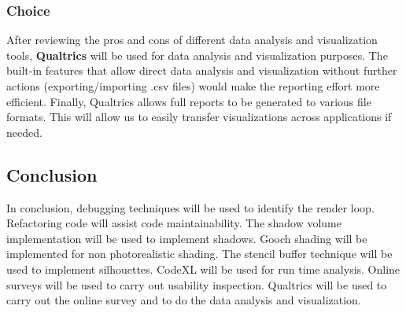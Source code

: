 \documentclass[10pt,journal,compsoc,draftclsnofoot]{IEEEtran}
\begin{document}
\subsubsection{Choice}
After reviewing the pros and cons of different data analysis and visualization tools, \textbf{Qualtrics} will be used for data analysis and visualization purposes.
The built-in features that allow direct data analysis and visualization without further actions (exporting/importing .csv files) would make the reporting effort more efficient.
Finally, Qualtrics allows full reports to be generated to various file formats.
This will allow us to easily transfer visualizations across applications if needed.
\newpage

\subsection{Conclusion}
In conclusion, debugging techniques will be used to identify the render loop.
Refactoring code will assist code maintainability.
The shadow volume implementation will be used to implement shadows.
Gooch shading will be implemented for non photorealistic shading.
The stencil buffer technique will be used to implement silhouettes.
CodeXL will be used for run time analysis.
Online surveys will be used to carry out usability inspection.
Qualtrics will be used to carry out the online survey and to do the data analysis and visualization.

\newpage



\end{document}

